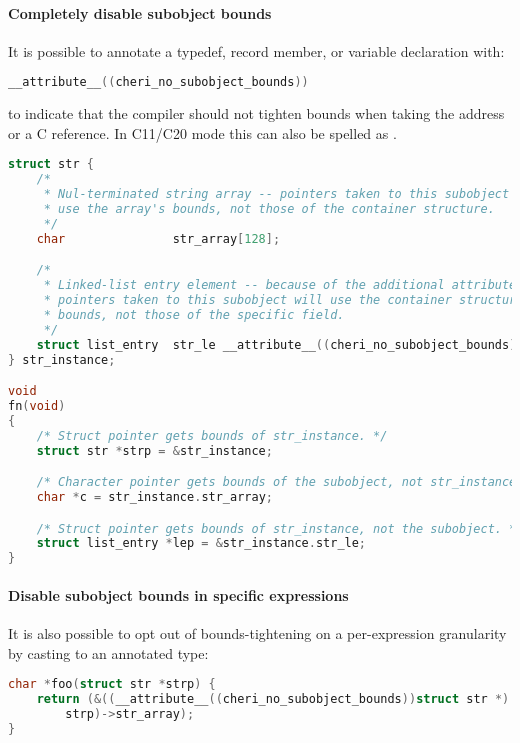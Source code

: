 \documentclass[12pt,twoside,openright,usletter]{article}
\newcommand{\ccode}[1]{{\small\ttfamily{#1}}}
\newcommand{\cxxcode}[1]{{\ccode{#1}}}
\newcommand*{\cpp}[1][]{C\textsmaller[2]{\nolinebreak[4]\hspace{-.05em}\raisebox{.45ex}{\textbf{++}}}}
\begin{document}
\paragraph{Completely disable subobject bounds} It is possible to annotate a typedef, record member,
or variable declaration with:

\begin{lstlisting}[language={C}]
__attribute__((cheri_no_subobject_bounds))
\end{lstlisting}

\noindent
to indicate that the compiler should not tighten bounds when taking the address or a \cpp{} reference. In \cpp{}11/C20 mode this can also be spelled as \cxxcode{[[cheri::no\_subobject\_bounds]]}.

\begin{lstlisting}[language={C}]
struct str {
    /*
     * Nul-terminated string array -- pointers taken to this subobject will
     * use the array's bounds, not those of the container structure.
     */
    char               str_array[128];

    /*
     * Linked-list entry element -- because of the additional attribute,
     * pointers taken to this subobject will use the container structure's
     * bounds, not those of the specific field.
     */
    struct list_entry  str_le __attribute__((cheri_no_subobject_bounds));
} str_instance;

void
fn(void)
{
    /* Struct pointer gets bounds of str_instance. */
    struct str *strp = &str_instance;

    /* Character pointer gets bounds of the subobject, not str_instance. */
    char *c = str_instance.str_array;

    /* Struct pointer gets bounds of str_instance, not the subobject. */
    struct list_entry *lep = &str_instance.str_le;
}
\end{lstlisting}

\paragraph{Disable subobject bounds in specific expressions}
It is also possible to opt out of bounds-tightening on a per-expression
granularity by casting to an annotated type:

\begin{lstlisting}[language={C}]
char *foo(struct str *strp) {
    return (&((__attribute__((cheri_no_subobject_bounds))struct str *)
        strp)->str_array);
}
\end{lstlisting}
\end{document}

